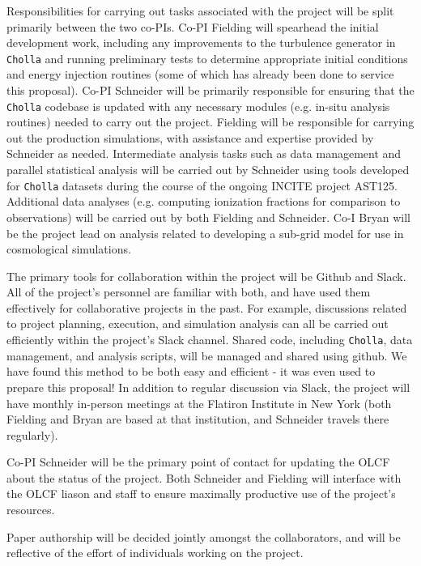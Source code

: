 \documentclass[11pt,letterpaper,english]{article}
\begin{document}
\begin{flushleft}
Responsibilities for carrying out tasks associated with the project will be split primarily between the two co-PIs. Co-PI Fielding will spearhead the initial development work, including any improvements to the turbulence generator in {\tt Cholla} and running preliminary tests to determine appropriate initial conditions and energy injection routines (some of which has already been done to service this proposal). Co-PI Schneider will be primarily responsible for ensuring that the {\tt Cholla} codebase is updated with any necessary modules (e.g. in-situ analysis routines) needed to carry out the project. Fielding will be responsible for carrying out the production simulations, with assistance and expertise provided by Schneider as needed. Intermediate analysis tasks such as data management and parallel statistical analysis will be carried out by Schneider using tools developed for {\tt Cholla} datasets during the course of the ongoing INCITE project AST125. Additional data analyses (e.g. computing ionization fractions for comparison to observations) will be carried out by both Fielding and Schneider. Co-I Bryan will be the project lead on analysis related to developing a sub-grid model for use in cosmological simulations.

The primary tools for collaboration within the project will be Github and Slack. All of the project's personnel are familiar with both, and have used them effectively for collaborative projects in the past. For example, discussions related to project planning, execution, and simulation analysis can all be carried out efficiently within the project's Slack channel. Shared code, including {\tt Cholla}, data management, and analysis scripts, will be managed and shared using github. We have found this method to be both easy and efficient - it was even used to prepare this proposal! In addition to regular discussion via Slack, the project will have monthly in-person meetings at the Flatiron Institute in New York (both Fielding and Bryan are based at that institution, and Schneider travels there regularly).

Co-PI Schneider will be the primary point of contact for updating the OLCF about the status of the project. Both Schneider and Fielding will interface with the OLCF liason and staff to ensure maximally productive use of the project's resources.

Paper authorship will be decided jointly amongst the collaborators, and will be reflective of the effort of individuals working on the project.


\end{flushleft}
\end{document}
